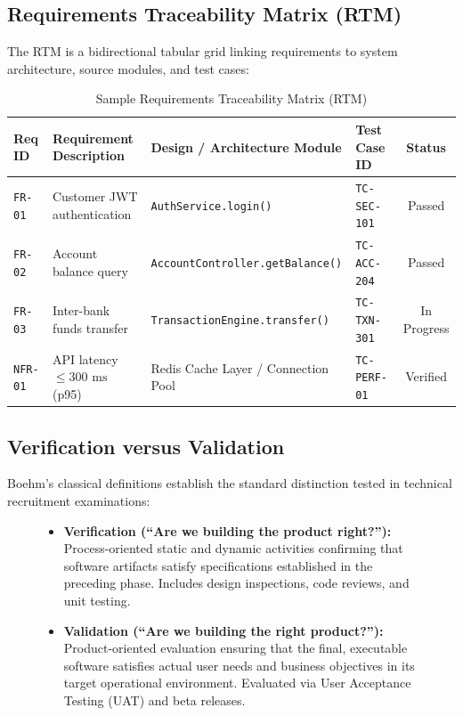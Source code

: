 \subsection{Requirements Traceability Matrix (RTM)}
The RTM is a bidirectional tabular grid linking requirements to system architecture, source modules, and test cases:
\begin{table}[htbp]
\centering
\small
\caption{Sample Requirements Traceability Matrix (RTM)}
\label{tab:sample_rtm}
\begin{tabularx}{\textwidth}{l p{4cm} p{3.5cm} l c}
\toprule
\textbf{Req ID} & \textbf{Requirement Description} & \textbf{Design / Architecture Module} & \textbf{Test Case ID} & \textbf{Status} \\
\midrule
\texttt{FR-01} & Customer JWT authentication & \texttt{AuthService.login()} & \texttt{TC-SEC-101} & Passed \\
\texttt{FR-02} & Account balance query & \texttt{AccountController.getBalance()} & \texttt{TC-ACC-204} & Passed \\
\texttt{FR-03} & Inter-bank funds transfer & \texttt{TransactionEngine.transfer()} & \texttt{TC-TXN-301} & In Progress \\
\texttt{NFR-01} & API latency $\le 300\text{ ms}$ (p95) & Redis Cache Layer / Connection Pool & \texttt{TC-PERF-01} & Verified \\
\bottomrule
\end{tabularx}
\end{table}

\subsection{Verification versus Validation}
Boehm's classical definitions establish the standard distinction tested in technical recruitment examinations:
\begin{figure}[htbp]
\centering
\begin{tcolorbox}[colback=codebg, colframe=primary, title=\textbf{Verification versus Validation: The Core Distinction}]
\begin{itemize}
    \item \textbf{Verification (``Are we building the product right?''):} Process-oriented static and dynamic activities confirming that software artifacts satisfy specifications established in the preceding phase. Includes design inspections, code reviews, and unit testing.
    \item \textbf{Validation (``Are we building the right product?''):} Product-oriented evaluation ensuring that the final, executable software satisfies actual user needs and business objectives in its target operational environment. Evaluated via User Acceptance Testing (UAT) and beta releases.
\end{itemize}
\end{tcolorbox}
\end{figure}


